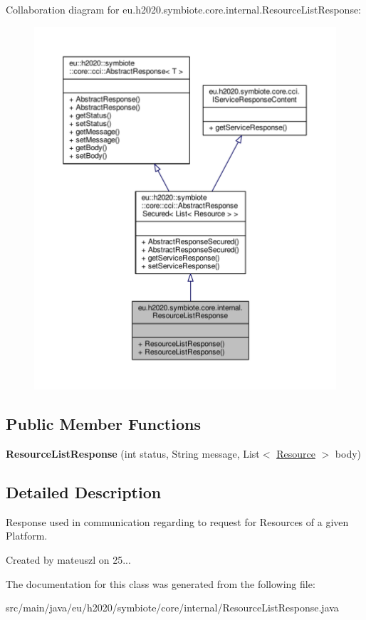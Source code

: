 Collaboration diagram for eu.\+h2020.\+symbiote.\+core.\+internal.\+Resource\+List\+Response\+:\nopagebreak
\begin{figure}[H]
\begin{center}
\leavevmode
\includegraphics[width=350pt]{classeu_1_1h2020_1_1symbiote_1_1core_1_1internal_1_1ResourceListResponse__coll__graph}
\end{center}
\end{figure}
\subsection*{Public Member Functions}
\begin{DoxyCompactItemize}
\item 
\mbox{\label{classeu_1_1h2020_1_1symbiote_1_1core_1_1internal_1_1ResourceListResponse_a18662a7b8de43bba27211b9d3ed1843e}} 
{\bfseries Resource\+List\+Response} (int status, String message, List$<$ \hyperlink{classeu_1_1h2020_1_1symbiote_1_1model_1_1cim_1_1Resource}{Resource} $>$ body)
\end{DoxyCompactItemize}


\subsection{Detailed Description}
Response used in communication regarding to request for Resources of a given Platform.

Created by mateuszl on 25... 

The documentation for this class was generated from the following file\+:\begin{DoxyCompactItemize}
\item 
src/main/java/eu/h2020/symbiote/core/internal/Resource\+List\+Response.\+java\end{DoxyCompactItemize}
